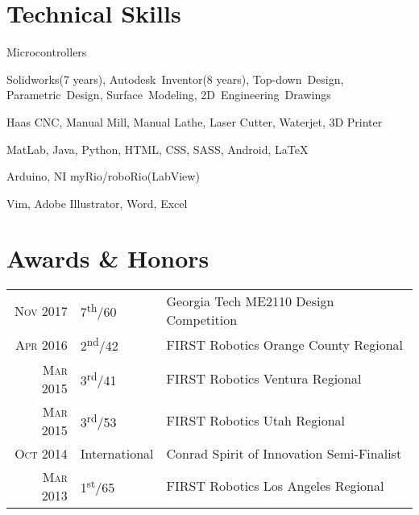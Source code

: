 \documentclass{resume}
\begin{document}
\section{Technical Skills}
\begin{skills}{Microcontrollers}
  \item [CAD] Solidworks(7 years), Autodesk~Inventor(8 years), Top-down~Design, Parametric~Design, Surface~Modeling, 2D~Engineering~Drawings
  \item [Manufacturing] Haas CNC, Manual Mill, Manual Lathe, Laser Cutter, Waterjet, 3D Printer
  \item [Programming] MatLab, Java, Python, HTML, CSS, SASS, Android, \LaTeX
  \item [Microcontrollers] Arduino, NI myRio/roboRio(LabView)
  \item [Software] Vim, Adobe Illustrator, Word, Excel
\end{skills}

\section{Awards \& Honors}
\begin{tabular}{rll}
  \textsc{Nov} 2017 & 7\textsuperscript{th}/60 & Georgia Tech ME2110 Design Competition\\
  \textsc{Apr} 2016 & 2\textsuperscript{nd}/42 & FIRST Robotics Orange County Regional\\
  \textsc{Mar} 2015 & 3\textsuperscript{rd}/41 & FIRST Robotics Ventura Regional\\
  \textsc{Mar} 2015 & 3\textsuperscript{rd}/53 & FIRST Robotics Utah Regional\\
  \textsc{Oct} 2014 & International & Conrad Spirit of Innovation Semi-Finalist\\
  \textsc{Mar} 2013 & 1\textsuperscript{st}/65 & FIRST Robotics Los Angeles Regional\\
\end{tabular}
\end{document}
